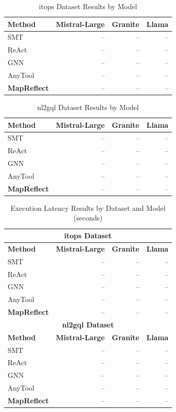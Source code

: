 
\begin{table}[htbp]
\centering
\caption{itops Dataset Results by Model}
\label{tab:itops_results}
\begin{tabular}{lrrr}
\toprule
\textbf{Method} & \textbf{Mistral-Large} & \textbf{Granite} & \textbf{Llama} \\
\midrule
SMT & -- & -- & -- \\
ReAct & -- & -- & -- \\
GNN & -- & -- & -- \\
AnyTool & -- & -- & -- \\
\textbf{MapReflect} & -- & -- & -- \\
\bottomrule
\end{tabular}
\end{table}

\begin{table}[htbp]
\centering
\caption{nl2gql Dataset Results by Model}
\label{tab:nl2gql_results}
\begin{tabular}{lrrr}
\toprule
\textbf{Method} & \textbf{Mistral-Large} & \textbf{Granite} & \textbf{Llama} \\
\midrule
SMT & -- & -- & -- \\
ReAct & -- & -- & -- \\
GNN & -- & -- & -- \\
AnyTool & -- & -- & -- \\
\textbf{MapReflect} & -- & -- & -- \\
\bottomrule
\end{tabular}
\end{table}

\begin{table}[htbp]
\centering
\caption{Execution Latency Results by Dataset and Model (seconds)}
\label{tab:latency_results}
\begin{tabular}{lrrr}
\toprule
\multicolumn{4}{c}{\textbf{itops Dataset}} \\
\midrule
\textbf{Method} & \textbf{Mistral-Large} & \textbf{Granite} & \textbf{Llama} \\
\midrule
SMT & -- & -- & -- \\
ReAct & -- & -- & -- \\
GNN & -- & -- & -- \\
AnyTool & -- & -- & -- \\
\textbf{MapReflect} & -- & -- & -- \\
\midrule
\multicolumn{4}{c}{\textbf{nl2gql Dataset}} \\
\midrule
\textbf{Method} & \textbf{Mistral-Large} & \textbf{Granite} & \textbf{Llama} \\
\midrule
SMT & -- & -- & -- \\
ReAct & -- & -- & -- \\
GNN & -- & -- & -- \\
AnyTool & -- & -- & -- \\
\textbf{MapReflect} & -- & -- & -- \\
\bottomrule
\end{tabular}
\end{table}